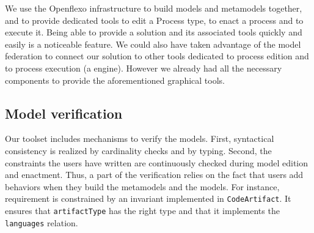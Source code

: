 
We use the Openflexo infrastructure to build models and metamodels together,
and to provide dedicated tools to edit a Process type, to enact a process and
to execute it. Being able to provide a solution and its associated tools
quickly and easily is a noticeable feature.  We could also have taken advantage
of the model federation to connect our solution to other tools dedicated to
process edition and to process execution (\eg a \BPMN engine). However we
already had all the necessary components to provide the aforementioned
graphical tools.

\subsection{Model verification}


Our toolset includes mechanisms to verify the models. First, syntactical
consistency is realized by cardinality checks and by typing. Second, the
constraints the users have written are continuously checked during model
edition and enactment. Thus, a part of the verification relies on the fact that
users add behaviors when they build the metamodels and the models. For
instance,  requirement is constrained by an invariant implemented in
\texttt{CodeArtifact}. It ensures that \texttt{artifactType} has the right type
and that it implements the \texttt{languages} relation.

